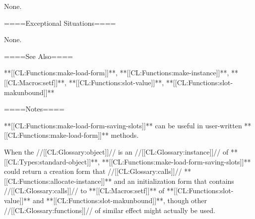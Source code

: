 None.

====Exceptional Situations====

None.

====See Also====

**[[CL:Functions:make-load-form]]**, **[[CL:Functions:make-instance]]**, **[[CL:Macros:setf]]**, **[[CL:Functions:slot-value]]**, **[[CL:Functions:slot-makunbound]]**

====Notes====

**[[CL:Functions:make-load-form-saving-slots]]** can be useful in user-written **[[CL:Functions:make-load-form]]** methods.

When the //[[CL:Glossary:object]]// is an //[[CL:Glossary:instance]]// of **[[CL:Types:standard-object]]**, **[[CL:Functions:make-load-form-saving-slots]]** could return a creation form that //[[CL:Glossary:calls]]// **[[CL:Functions:allocate-instance]]** and an initialization form that contains //[[CL:Glossary:calls]]// to **[[CL:Macros:setf]]** of **[[CL:Functions:slot-value]]** and **[[CL:Functions:slot-makunbound]]**, though other //[[CL:Glossary:functions]]// of similar effect might actually be used.

   
